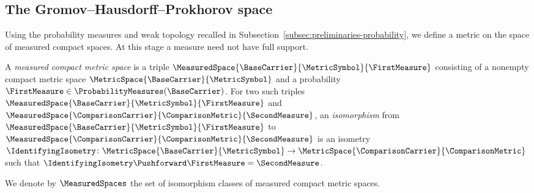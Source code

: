 \subsection{The Gromov--Hausdorff--Prokhorov space}\label{subsec:measures-ghp}
Using the probability measures and weak topology recalled in
Subsection~\ref{subsec:preliminaries-probability},
we define a metric on the space of measured compact spaces.
At this stage a measure need not have full support.

\begin{definition}\label{def:measured-space}
A \emph{measured compact metric space} is a triple
$\MeasuredSpace{\BaseCarrier}{\MetricSymbol}{\FirstMeasure}$
consisting of a nonempty compact metric space
$\MetricSpace{\BaseCarrier}{\MetricSymbol}$
and a probability
$\FirstMeasure\in\ProbabilityMeasures(\BaseCarrier)$.
For two such triples
$\MeasuredSpace{\BaseCarrier}{\MetricSymbol}{\FirstMeasure}$
and
$\MeasuredSpace{\ComparisonCarrier}{\ComparisonMetric}{\SecondMeasure}$,
an \emph{isomorphism} from
$\MeasuredSpace{\BaseCarrier }{\MetricSymbol }{\FirstMeasure }$
to
$\MeasuredSpace{\ComparisonCarrier }{\ComparisonMetric }{\SecondMeasure }$
is an isometry
$\IdentifyingIsometry \colon\MetricSpace{\BaseCarrier }{\MetricSymbol }\to\MetricSpace{\ComparisonCarrier }{\ComparisonMetric }$
such that
$\IdentifyingIsometry \Pushforward\FirstMeasure =\SecondMeasure $.
\end{definition}

We denote by
$\MeasuredSpaces$
the set of isomorphism classes of measured compact metric spaces.

